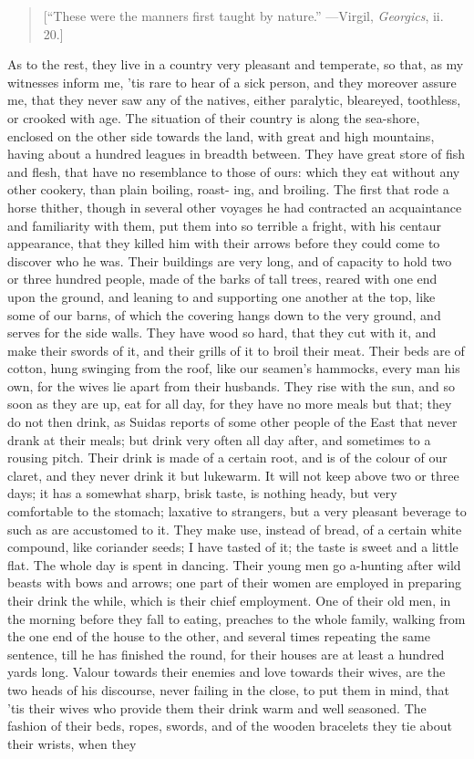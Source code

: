 \documentclass[twocolumn]{article}
\newcommand{\specialbreaks}[1]{\linebreak\newpage\noindent\setline{#1}}
\begin{document}
	\begin{quote}
		[``These were the manners first taught by nature.'' ---Virgil, \emph{Georgics}, ii. 20.]
	\end{quote}
	
	As to the rest, they live in a country very pleasant and temperate, so that, as my witnesses inform me, ’tis rare to hear of a sick person, and they moreover assure me, that they never saw any of the natives, either paralytic, bleareyed, toothless, or crooked with age. The situation of their country is along the sea-shore, enclosed on the other side towards the land, with great and high mountains, having about a hundred leagues in breadth between. They have great store of fish and flesh, that have no resemblance to those of ours: which they eat without any other cookery, than plain boiling, roast- \specialbreaks{253}ing, and broiling. The first that rode a horse thither, though in several other voyages he had contracted an acquaintance and familiarity with them, put them into so terrible a fright, with his centaur appearance, that they killed him with their arrows before they could come to discover who he was. Their buildings are very long, and of capacity to hold two or three hundred people, made of the barks of tall trees, reared with one end upon the ground, and leaning to and supporting one another at the top, like some of our barns, of which the covering hangs down to the very ground, and serves for the side walls. They have wood so hard, that they cut with it, and make their swords of it, and their grills of it to broil their meat. Their beds are of cotton, hung swinging from the roof, like our seamen’s hammocks, every man his own, for the wives lie apart from their husbands. They rise with the sun, and so soon as they are up, eat for all day, for they have no more meals but that; they do not then drink, as Suidas reports of some other people of the East that never drank at their meals; but drink very often all day after, and sometimes to a rousing pitch. Their drink is made of a certain root, and is of the colour of our claret, and they never drink it but lukewarm. It will not keep above two or three days; it has a somewhat sharp, brisk taste, is nothing heady, but very comfortable to the stomach; laxative to strangers, but a very pleasant beverage to such as are accustomed to it. They make use, instead of bread, of a certain white compound, like coriander seeds; I have tasted of it; the taste is sweet and a little flat. The whole day is spent in dancing. Their young men go a-hunting after wild beasts with bows and arrows; one part of their women are employed in preparing their drink the while, which is their chief employment. One of their old men, in the morning before they fall to eating, preaches to the whole family, walking from the one end of the house to the other, and several times repeating the same sentence, till he has finished the round, for their houses are at least a hundred yards long. Valour towards their enemies and love towards their wives, are the two heads of his discourse, never failing in the close, to put them in mind, that ’tis their wives who provide them their drink warm and well seasoned. The fashion of their beds, ropes, swords, and of the wooden bracelets they tie about their wrists, when they 
\end{document}
